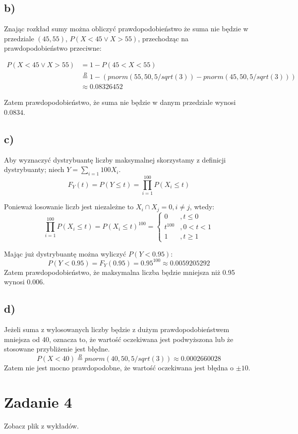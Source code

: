 \documentclass{article}
\begin{document}
\subsection*{b)}
Znając rozkład sumy można obliczyć prawdopodobieństwo że suma nie będzie w przedziale $(45,55)$, $P(X<45 \vee X>55)$, przechodząc na prawdopodobieństwo przeciwne:

\begin{align*}
P(X<45 \vee X>55) & = 1 - P(45<X<55) \\
& \overset{R}{=} 1 - (pnorm(55,50,5/sqrt(3)) - pnorm(45, 50, 5/sqrt(3))) \\
& \approx 0.08326452
\end{align*}

Zatem prawdopodobieństwo, że suma nie będzie w danym przedziale wynosi $0.0834$.

\subsection*{c)}
Aby wyznaczyć dystrybuantę liczby maksymalnej skorzystamy z definicji dystrybuanty; niech $Y = \sum_{i=1}{100}X_i$.
\[
F_Y(t) = P(Y\leq t) = \prod_{i=1}^{100}P(X_i \leq t)
\]

Ponieważ losowanie liczb jest niezależne to $X_i \cap X_j = 0, i \neq j$, wtedy:
\[
\prod_{i=1}^{100}P(X_i \leq t) = P(X_i \leq t)^{100} = 
 \left\{
\begin{array}{ll}
0 &, t \leq 0 \\
t^{100} &, 0 < t < 1 \\
1 &, t \geq 1
\end{array}
\right.
\]

Mając już dystrybuantę można wyliczyć $P(Y<0.95)$:
\[
P(Y<0.95) = F_Y(0.95) = 0.95^{100} \approx 0.0059205292
\]
Zatem prawdopodobieństwo, że maksymalna liczba będzie mniejsza niż 0.95 wynosi 0.006.

\subsection*{d)}
Jeżeli suma z wylosowanych liczby będzie z dużym prawdopodobieństwem mniejsza od 40, oznacza to, że wartość oczekiwana jest podwyższona lub że stosowane przybliżenie jest błędne. 
\[
P(X<40) \overset{R}{=} pnorm(40, 50, 5/sqrt(3)) \approx 0.0002660028
\]
Zatem nie jest mocno prawdopodobne, że wartość oczekiwana jest błędna o $\pm10$.

\newpage
\section{Zadanie 4}
Zobacz plik z wykładów.
\end{document}
